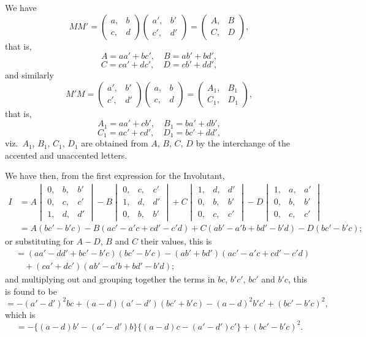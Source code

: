 \documentclass[11pt,a4paper]{article}
\begin{document}
We have
\[
M M' = \begin{pmatrix} a, & b \\ c, & d \end{pmatrix} \begin{pmatrix} a', & b' \\ c', & d' \end{pmatrix} = \begin{pmatrix} A, & B \\ C, & D \end{pmatrix},
\]
that is,
\[
A = a a' + b c',\quad B = a b' + b d',
\]
\[
C = c a' + d c',\quad D = c b' + d d',
\]
and similarly
\[
M' M = \begin{pmatrix} a', & b' \\ c', & d' \end{pmatrix} \begin{pmatrix} a, & b \\ c, & d \end{pmatrix} = \begin{pmatrix} A_1, & B_1 \\ C_1, & D_1 \end{pmatrix},
\]
that is,
\[
A_1 = a a' + c b',\quad B_1 = b a' + d b',
\]
\[
C_1 = a c' + c d',\quad D_1 = b c' + d d',
\]
viz.\ $A_1$, $B_1$, $C_1$, $D_1$ are obtained from $A$, $B$, $C$, $D$ by the interchange of the accented and unaccented letters.

We have then, from the first expression for the Involutant,
\begin{align*}
I &= A \begin{vmatrix} 0, & b, & b' \\ 0, & c, & c' \\ 1, & d, & d' \end{vmatrix} - B \begin{vmatrix} 0, & c, & c' \\ 1, & d, & d' \\ 0, & b, & b' \end{vmatrix} + C \begin{vmatrix} 1, & d, & d' \\ 0, & b, & b' \\ 0, & c, & c' \end{vmatrix} - D \begin{vmatrix} 1, & a, & a' \\ 0, & b, & b' \\ 0, & c, & c' \end{vmatrix}\\
&= A (bc' - b'c) - B (ac' - a'c + cd' - c'd) + C (ab' - a'b + bd' - b'd) - D (bc' - b'c);
\end{align*}
or substituting for $A - D$, $B$ and $C$ their values, this is
\begin{align*}
&= (a a' - d d' + b c' - b' c)(b c' - b' c) - (a b' + b d')(a c' - a' c + c d' - c' d)\\
&\quad + (c a' + d c')(a b' - a' b + b d' - b' d);
\end{align*}
and multiplying out and grouping together the terms in $bc$, $b'c'$, $bc'$ and $b'c$, this is found to be
\[
= - (a' - d')^2 b c + (a - d)(a' - d')(b c' + b' c) - (a - d)^2 b' c' + (b c' - b' c)^2,
\]
which is
\[
= - \{(a - d) b' - (a' - d') b\}\{(a - d) c - (a' - d') c'\} + (b c' - b' c)^2.
\]
\end{document}

